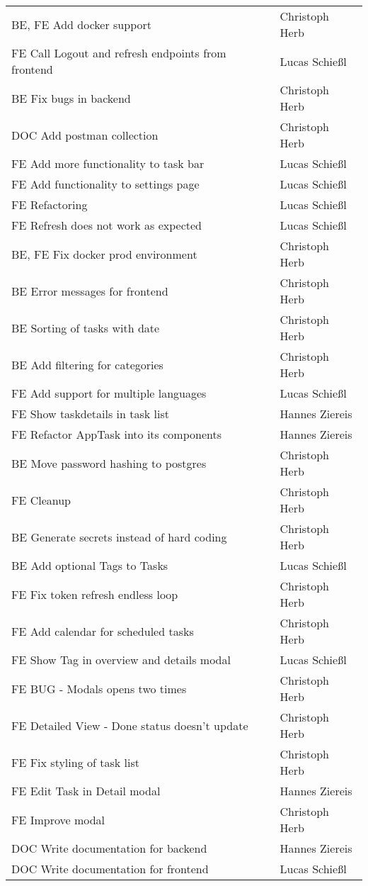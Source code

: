 \begin{longtable}{ll}
BE, FE Add docker support & Christoph Herb \\
FE Call Logout and refresh endpoints from frontend & Lucas Schießl \\
BE Fix bugs in backend & Christoph Herb \\
DOC Add postman collection & Christoph Herb \\
FE Add more functionality to task bar & Lucas Schießl \\
FE Add functionality to settings page & Lucas Schießl \\
FE Refactoring & Lucas Schießl \\
FE Refresh does not work as expected & Lucas Schießl \\
BE, FE Fix docker prod environment & Christoph Herb \\
BE Error messages for frontend & Christoph Herb \\
BE Sorting of tasks with date & Christoph Herb \\
BE Add filtering for categories & Christoph Herb \\
FE Add support for multiple languages & Lucas Schießl \\
FE Show taskdetails in task list & Hannes Ziereis \\
FE Refactor AppTask into its components & Hannes Ziereis \\
BE Move password hashing to postgres & Christoph Herb \\
FE Cleanup & Christoph Herb \\
BE Generate secrets instead of hard coding & Christoph Herb \\
BE Add optional Tags to Tasks & Lucas Schießl \\
FE Fix token refresh endless loop & Christoph Herb \\
FE Add calendar for scheduled tasks & Christoph Herb \\
FE Show Tag in overview and details modal & Lucas Schießl \\
FE BUG - Modals opens two times & Christoph Herb \\
FE Detailed View - Done status doesn't update & Christoph Herb \\
FE Fix styling of task list & Christoph Herb \\
FE  Edit Task in Detail modal & Hannes Ziereis \\
FE Improve modal & Christoph Herb \\
DOC Write documentation for backend & Hannes Ziereis \\
DOC Write documentation for frontend & Lucas Schießl \\

\end{longtable}
